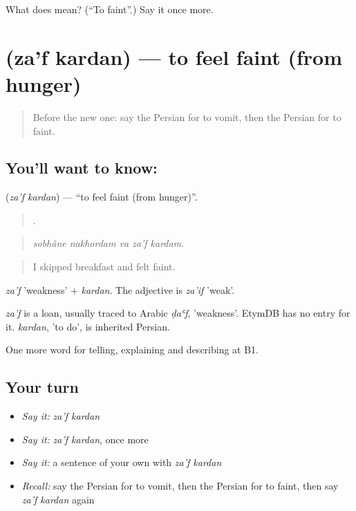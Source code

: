 \begin{tcolorbox}[breakable,colback=teal!4,colframe=teal!35!black,title={Before you move on}]
What does   mean? (\textquotedblleft{}To faint\textquotedblright{}.) Say it once more.
\end{tcolorbox}
\section[\texorpdfstring{\fa{ضعف} \fa{کردن} (za'f kardan)}{ضعف کردن (za'f kardan)}]{  (za'f kardan) — to feel faint (from hunger)}

\label{lesson:FA-C492-zaf-kardan}



\begin{quote}
Before the new one: say the Persian for to vomit, then the Persian for to faint.
\end{quote}

\subsection*{You'll want to know:  }
\textbf{ } (\emph{za'f kardan}) — \textquotedblleft{}to feel faint (from hunger)\textquotedblright{}.

\begin{quote}
    .
\end{quote}

\begin{quote}
\emph{sobhâne nakhordam va za'f kardam.}
\end{quote}

\begin{quote}
I skipped breakfast and felt faint.
\end{quote}

\emph{za'f} 'weakness' + \emph{kardan}. The adjective is \emph{za'if} 'weak'.

\begin{cousinweb}
\emph{za'f} is a loan, usually traced to Arabic \emph{ḍaʿf}, 'weakness'. EtymDB has no entry for it. \emph{kardan}, 'to do', is inherited Persian.
\end{cousinweb}

\begin{grammarlens}[title={What you've built}]
One more word for telling, explaining and describing at B1.
\end{grammarlens}

\subsection*{Your turn}
\begin{itemize}
\raggedright
  \item \emph{Say it:} \emph{za'f kardan}
  \item \emph{Say it:} \emph{za'f kardan}, once more
  \item \emph{Say it:} a sentence of your own with \emph{za'f kardan}
  \item \emph{Recall:} say the Persian for to vomit, then the Persian for to faint, then say \emph{za'f kardan} again
\end{itemize}

